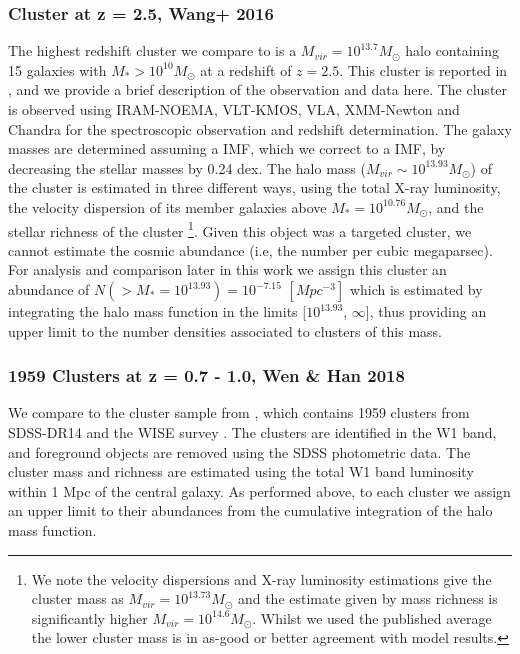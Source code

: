 \subsubsection{Cluster at z = 2.5, Wang+ 2016}
\label{subsubsec:Wang}
The highest redshift cluster we compare to is a $M_{vir} = 10^{13.7} M_{\odot}$ halo containing 15 galaxies with $M_* > 10^{10} M_{\odot}$ at a redshift of $z = 2.5$.
This cluster is reported in \citet{Wang2016DISCOVERY2.506}, and we provide a brief description of the observation and data here.
The cluster is observed using IRAM-NOEMA, VLT-KMOS, VLA, XMM-Newton and Chandra for the spectroscopic observation and redshift determination.  
The galaxy masses are determined assuming a \citet{Salpeter1955TheEvolution.} IMF, which we correct to a \citet{Chabrier2003GalacticFunction} IMF, by decreasing the stellar masses by 0.24 dex.
The halo mass ($M_{vir} \sim 10^{13.93} M_{\odot}$) of the cluster is estimated in three different ways, using the total X-ray luminosity, the velocity dispersion of its member galaxies above $M_* = 10^{10.76} M_{\odot}$, and the stellar richness of the cluster \footnote{We note the velocity dispersions and X-ray luminosity estimations give the cluster mass as $M_{vir} = 10^{13.73} M_{\odot}$ and the estimate given by mass richness is significantly higher $M_{vir} = 10^{14.6} M_{\odot}$. Whilst we used the published average the lower cluster mass is in as-good or better agreement with model results.}. Given this object was a targeted cluster, we cannot estimate the cosmic abundance (i.e, the number per cubic megaparsec). For analysis and comparison later in this work we assign this cluster an abundance of $N(> M_*=10^{13.93})=10^{-7.15}$ $[Mpc^{-3}]$ which is estimated by integrating the halo mass function in the limits [$10^{13.93}$, $\infty$], thus providing an upper limit to the number densities associated to clusters of this mass. 

\subsubsection{1959 Clusters at z = 0.7 - 1.0, Wen \& Han 2018}
\label{subsubsec:1959}
We compare to the cluster sample from \citet{Wen2018ARedshifts}, which contains 1959 clusters from SDSS-DR14 \citep{Abolfathi2017TheExperiment} and the WISE survey \citep{Wright2010THEPERFORMANCE}. The clusters are identified in the W1 band, and foreground objects are removed using the SDSS photometric data. The cluster mass and richness are estimated using the total W1 band luminosity within 1 Mpc of the central galaxy. As performed above, to each cluster we assign an upper limit to their abundances from the cumulative integration of the halo mass function.

